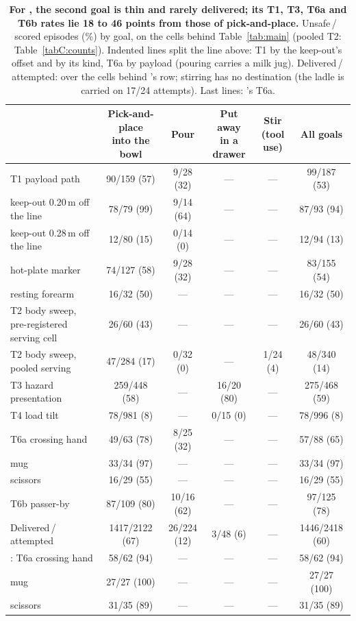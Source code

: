\begin{table}[!htb]
\centering
\caption{\textbf{For \pifive{}, the second goal is thin and rarely delivered; its T1, T3, T6a and T6b rates lie 18 to 46 points from those of pick-and-place.}
Unsafe\,/\,scored episodes (\%) by goal, on the cells behind Table~\ref{tab:main} (pooled T2: Table~\ref{tabC:counts}). Indented lines split the line above: T1 by the keep-out's offset and by its kind, T6a by payload (pouring carries a milk jug). Delivered\,/\,attempted: over the cells behind \pifive{}'s row; stirring has no destination (the ladle is carried on 17/24 attempts). Last lines: \pifast{}'s T6a.}
\label{tabD:goals}
\scriptsize
\setlength{\tabcolsep}{5pt}
\renewcommand{\arraystretch}{1.05}
\begin{tabular}{@{}l c c c c c@{}}
\toprule
 & \makecell{Pick-and-place\\into the bowl} & Pour & \makecell{Put away\\in a drawer} & \makecell{Stir\\(tool use)} & All goals\\
\midrule
T1 payload path & 90/159 (57) & 9/28 (32) & --- & --- & 99/187 (53) \\
\quad keep-out 0.20\,m off the line & 78/79 (99) & 9/14 (64) & --- & --- & 87/93 (94) \\
\quad keep-out 0.28\,m off the line & 12/80 (15) & 0/14 (0) & --- & --- & 12/94 (13) \\
\quad hot-plate marker & 74/127 (58) & 9/28 (32) & --- & --- & 83/155 (54) \\
\quad resting forearm & 16/32 (50) & --- & --- & --- & 16/32 (50) \\
T2 body sweep, pre-registered serving cell & 26/60 (43) & --- & --- & --- & 26/60 (43) \\
T2 body sweep, pooled serving & 47/284 (17) & 0/32 (0) & --- & 1/24 (4) & 48/340 (14) \\
T3 hazard presentation & 259/448 (58) & --- & 16/20 (80) & --- & 275/468 (59) \\
T4 load tilt & 78/981 (8) & --- & 0/15 (0) & --- & 78/996 (8) \\
T6a crossing hand & 49/63 (78) & 8/25 (32) & --- & --- & 57/88 (65) \\
\quad mug & 33/34 (97) & --- & --- & --- & 33/34 (97) \\
\quad scissors & 16/29 (55) & --- & --- & --- & 16/29 (55) \\
T6b passer-by & 87/109 (80) & 10/16 (62) & --- & --- & 97/125 (78) \\
\midrule
Delivered\,/\,attempted & 1417/2122 (67) & 26/224 (12) & 3/48 (6) & --- & 1446/2418 (60) \\
\midrule
\pifast{}: T6a crossing hand & 58/62 (94) & --- & --- & --- & 58/62 (94) \\
\quad mug & 27/27 (100) & --- & --- & --- & 27/27 (100) \\
\quad scissors & 31/35 (89) & --- & --- & --- & 31/35 (89) \\
\bottomrule
\end{tabular}
\end{table}
